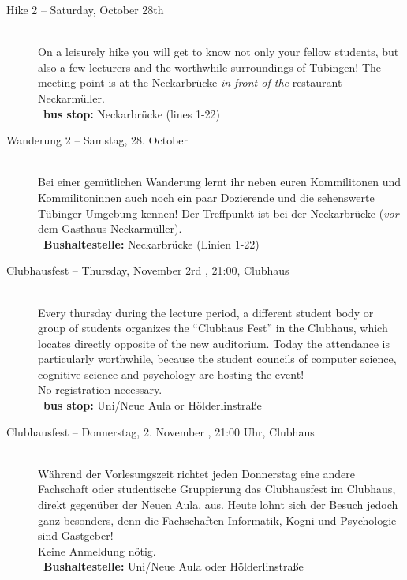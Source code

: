 \begin{description}
\ifml
	\item[Hike 2 -- Saturday, October 28th \YEAR]~\\%
	On a leisurely hike you will get to know not only your fellow students,
	but also a few lecturers and the worthwhile surroundings of Tübingen!
	The meeting point is at the Neckarbrücke \emph{in front of the} restaurant \glqq Neckarmüller\grqq. \\
	~\textbf{bus stop:} Neckarbrücke (lines 1-22)
\else
	\item[Wanderung 2 -- Samstag, 28. October \YEAR]~\\%
	Bei einer gemütlichen Wanderung lernt ihr neben euren Kommilitonen und Kommilitoninnen auch
	noch ein paar Dozierende und die sehenswerte Tübinger Umgebung kennen!
	Der Treffpunkt ist bei der Neckarbrücke (\emph{vor} dem Gasthaus \glqq Neckarmüller\grqq).\\
	~\textbf{Bushaltestelle:} Neckarbrücke (Linien 1-22)
\fi

\ifml
    \item[Clubhausfest -- Thursday, November 2rd \YEAR, 21:00, Clubhaus]\ \\
	Every thursday during the lecture period, a different student body or group of students organizes the "`Clubhaus Fest"' in
	the Clubhaus, which locates directly opposite of the new auditorium. Today the attendance is particularly worthwhile, because
	the student councils of computer science, cognitive science and psychology are hosting the event! \\
	No registration necessary.\\
	~\textbf{bus stop:} Uni/Neue Aula or Hölderlinstraße
\else
    \item[Clubhausfest -- Donnerstag, 2. November \YEAR, 21:00 Uhr, Clubhaus]\ \\
	Während der Vorlesungszeit richtet jeden Donnerstag eine andere Fachschaft oder studentische Gruppierung das Clubhausfest
	im Clubhaus, direkt gegenüber der Neuen Aula, aus. Heute lohnt sich der Besuch jedoch ganz besonders, denn die Fachschaften
	Informatik, Kogni und Psychologie sind Gastgeber! \\
	Keine Anmeldung nötig.\\
	~\textbf{Bushaltestelle:} Uni/Neue Aula oder Hölderlinstraße
\fi


\end{description}
